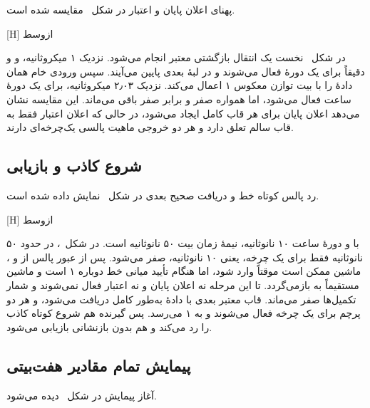 پهنای اعلان پایان و اعتبار در شکل~ مقایسه شده است.

[H]
‌ازوسط

در شکل~ نخست یک انتقال بازگشتی معتبر  انجام می‌شود.
نزدیک ۱ میکروثانیه،  و  و
 دقیقاً برای یک دورهٔ  فعال می‌شوند و در لبهٔ بعدی پایین
می‌آیند. سپس ورودی خام همان دادهٔ  را با بیت توازن معکوس ۱ اعمال می‌کند. نزدیک
۲٫۰۳ میکروثانیه،  برای یک دورهٔ ساعت فعال می‌شود، اما
 همواره صفر و  برابر صفر باقی می‌ماند.
این مقایسه نشان می‌دهد اعلان پایان برای هر قاب کامل ایجاد می‌شود، در حالی که اعلان اعتبار
فقط به قاب سالم تعلق دارد و هر دو خروجی ماهیت پالسی یک‌چرخه‌ای دارند.


\subsection{شروع کاذب و بازیابی}

رد پالس کوتاه خط و دریافت صحیح بعدی در شکل~ نمایش داده شده است.

[H]
‌ازوسط

با  و دورهٔ ساعت ۱۰ نانوثانیه، نیمهٔ زمان بیت ۵۰ نانوثانیه است. در
شکل~،  در حدود ۵۰ نانوثانیه فقط برای یک چرخه، یعنی ۱۰
نانوثانیه، صفر می‌شود. پس از عبور پالس از  و ، ماشین ممکن
است موقتاً وارد  شود، اما هنگام تأیید میانی خط دوباره ۱ است و ماشین مستقیماً به
 بازمی‌گردد. تا این مرحله نه اعلان پایان و نه اعتبار فعال نمی‌شوند و شمار تکمیل‌ها
صفر می‌ماند. قاب معتبر بعدی با دادهٔ  به‌طور کامل دریافت می‌شود،
 و هر دو پرچم برای یک چرخه فعال می‌شوند و
 به ۱ می‌رسد. پس گیرنده هم شروع کوتاه کاذب را رد می‌کند و هم بدون
بازنشانی بازیابی می‌شود.


\subsection{پیمایش تمام مقادیر هفت‌بیتی}

آغاز پیمایش در شکل~ دیده می‌شود.

